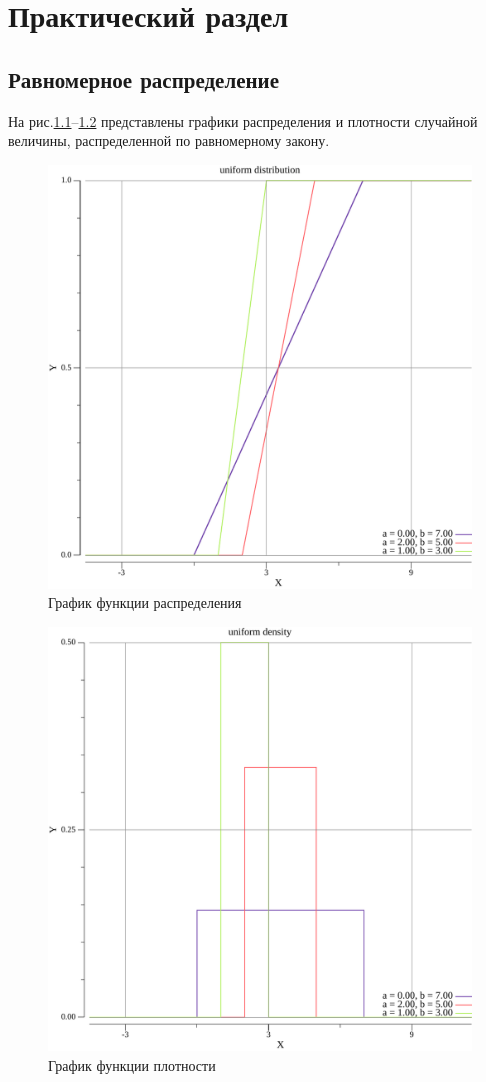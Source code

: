 \chapter{Практический раздел}

\section{Равномерное распределение}

На рис.\ref{fig:1}--\ref{fig:2} представлены графики распределения и плотности случайной величины, распределенной по равномерному закону.

\begin{figure}[H]
    \begin{center}
    \includegraphics[width=0.7\linewidth]{../code/out/uniform/distribution/all.pdf}
    \caption{График функции распределения}
    \label{fig:1}
    \end{center}
\end{figure}

\begin{figure}[H]
    \begin{center}
    \includegraphics[width=0.7\linewidth]{../code/out/uniform/density/all.pdf}
    \caption{График функции плотности}
    \label{fig:2}
    \end{center}
\end{figure}

